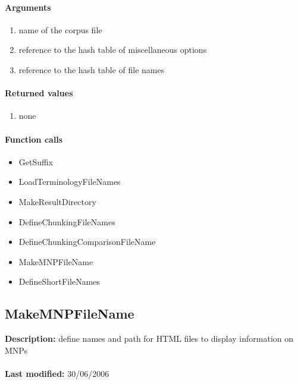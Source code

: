 \paragraph{Arguments}
\begin{enumerate}
\item name of the corpus file
\item reference to the hash table of miscellaneous options
\item reference to the hash table of file names
\end{enumerate}

\paragraph{Returned values}
\begin{enumerate}
\item none
\end{enumerate}

\paragraph{Function calls}
\begin{itemize}
\item GetSuffix
\item LoadTerminologyFileNames
\item MakeResultDirectory
\item DefineChunkingFileNames
\item DefineChunkingComparisonFileName
\item MakeMNPFileName
\item DefineShortFileNames
\end{itemize}

\subsection{MakeMNPFileName}
\textbf{Description:} define names and path for HTML files to display information on MNPs\\
\\\textbf{Last modified:} 30/06/2006

